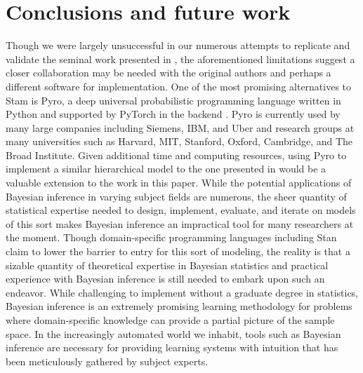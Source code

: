 \documentclass[
  12pt,
  twoside]{book}
\theoremstyle{definition}
\theoremstyle{definition}
\theoremstyle{definition}
\theoremstyle{remark}
\begin{document}
\hypertarget{conclusions-and-future-work}{%
\chapter*{Conclusions and future work}\label{conclusions-and-future-work}}

Though we were largely unsuccessful in our numerous attempts to replicate and validate the seminal work presented in \citet{Kotta2019}, the aforementioned limitations suggest a closer collaboration may be needed with the original authors and perhaps a different software for implementation.
One of the most promising alternatives to Stam is Pyro, a deep universal probabilistic programming language written in Python and supported by PyTorch in the backend \citep[\citet{phan2019composable}]{bingham2018pyro}.
Pyro is currently used by many large companies including Siemens, IBM, and Uber and research groups at many universities such as Harvard, MIT, Stanford, Oxford, Cambridge, and The Broad Institute.
Given additional time and computing resources, using Pyro to implement a similar hierarchical model to the one presented in \citet{Kotta2019} would be a valuable extension to the work in this paper.
While the potential applications of Bayesian inference in varying subject fields are numerous, the sheer quantity of statistical expertise needed to design, implement, evaluate, and iterate on models of this sort makes Bayesian inference an impractical tool for many researchers at the moment.
Though domain-specific programming languages including Stan claim to lower the barrier to entry for this sort of modeling, the reality is that a sizable quantity of theoretical expertise in Bayesian statistics and practical experience with Bayesian inference is still needed to embark upon such an endeavor.
While challenging to implement without a graduate degree in statistics, Bayesian inference is an extremely promising learning methodology for problems where domain-specific knowledge can provide a partial picture of the sample space.
In the increasingly automated world we inhabit, tools such as Bayesian inference are necessary for providing learning systems with intuition that has been meticulously gathered by subject experts.

  
\end{document}
